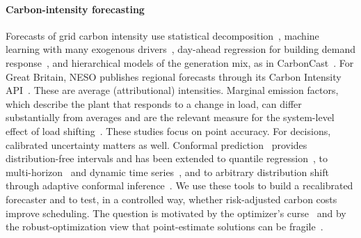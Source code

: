 \paragraph{Carbon-intensity forecasting} Forecasts of grid carbon intensity use statistical decomposition~\cite{bokde2021short}, machine learning with many exogenous drivers~\cite{leerbeck2020short}, day-ahead regression for building demand response~\cite{lowry2018day}, and hierarchical models of the generation mix, as in CarbonCast~\cite{maji2022carboncast}. For Great Britain, NESO publishes regional forecasts through its Carbon Intensity API~\cite{nesoapi}. These are average (attributional) intensities. Marginal emission factors, which describe the plant that responds to a change in load, can differ substantially from averages and are the relevant measure for the system-level effect of load shifting~\cite{hawkes2010estimating,silerevans2012marginal}. These studies focus on point accuracy. For decisions, calibrated uncertainty matters as well. Conformal prediction~\cite{vovk2005algorithmic,lei2018distribution,angelopoulos2023conformal} provides distribution-free intervals and has been extended to quantile regression~\cite{romano2019conformalized}, to multi-horizon~\cite{stankeviciute2021conformal} and dynamic time series~\cite{xu2023conformal}, and to arbitrary distribution shift through adaptive conformal inference~\cite{gibbs2021adaptive}. We use these tools to build a recalibrated forecaster and to test, in a controlled way, whether risk-adjusted carbon costs improve scheduling. The question is motivated by the optimizer's curse~\cite{smith2006optimizer} and by the robust-optimization view that point-estimate solutions can be fragile~\cite{bental2000robust,bertsimas2004price}.
